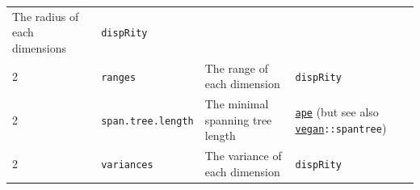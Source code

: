 \documentclass[]{book}
\begin{document}
\begin{longtable}[]{@{}llll@{}}
\begin{minipage}[t]{0.64\columnwidth}
The radius of each dimensions\strut
\end{minipage} & \begin{minipage}[t]{0.10\columnwidth}\raggedright
\texttt{dispRity}\strut
\end{minipage}\tabularnewline
\begin{minipage}[t]{0.07\columnwidth}\raggedright
2\strut
\end{minipage} & \begin{minipage}[t]{0.07\columnwidth}\raggedright
\texttt{ranges}\strut
\end{minipage} & \begin{minipage}[t]{0.64\columnwidth}\raggedright
The range of each dimension\strut
\end{minipage} & \begin{minipage}[t]{0.10\columnwidth}\raggedright
\texttt{dispRity}\strut
\end{minipage}\tabularnewline
\begin{minipage}[t]{0.07\columnwidth}\raggedright
2\strut
\end{minipage} & \begin{minipage}[t]{0.07\columnwidth}\raggedright
\texttt{span.tree.length}\strut
\end{minipage} & \begin{minipage}[t]{0.64\columnwidth}\raggedright
The minimal spanning tree length\strut
\end{minipage} & \begin{minipage}[t]{0.10\columnwidth}\raggedright
\href{https://cran.r-project.org/web/packages/vegan/index.html}{\texttt{ape}} (but see also \href{https://cran.r-project.org/web/packages/vegan/index.html}{\texttt{vegan}}\texttt{::spantree})\strut
\end{minipage}\tabularnewline
\begin{minipage}[t]{0.07\columnwidth}\raggedright
2\strut
\end{minipage} & \begin{minipage}[t]{0.07\columnwidth}\raggedright
\texttt{variances}\strut
\end{minipage} & \begin{minipage}[t]{0.64\columnwidth}\raggedright
The variance of each dimension\strut
\end{minipage} & \begin{minipage}[t]{0.10\columnwidth}\raggedright
\texttt{dispRity}\strut
\end{minipage}\tabularnewline
\bottomrule
\end{longtable}
\end{document}
